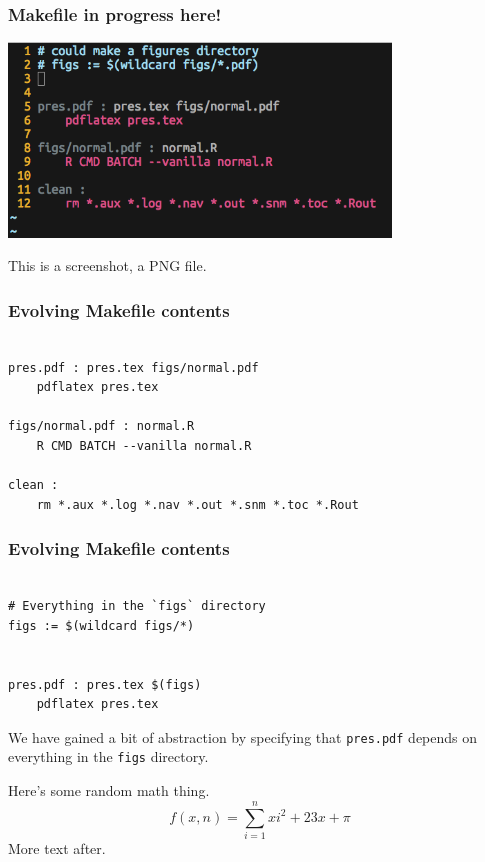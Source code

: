 \documentclass{beamer}
\begin{document}

\begin{frame}
\frametitle{Makefile in progress here!}
\includegraphics[width=4in]{figs/makefile.png}

This is a screenshot, a PNG file.
\end{frame}


\begin{frame}[fragile]
\frametitle{Evolving Makefile contents}
\begin{verbatim}

pres.pdf : pres.tex figs/normal.pdf
    pdflatex pres.tex

figs/normal.pdf : normal.R
    R CMD BATCH --vanilla normal.R 

clean :
    rm *.aux *.log *.nav *.out *.snm *.toc *.Rout

\end{verbatim}
\end{frame}


\begin{frame}[fragile]
\frametitle{Evolving Makefile contents}
\begin{verbatim}

# Everything in the `figs` directory
figs := $(wildcard figs/*)


pres.pdf : pres.tex $(figs)
    pdflatex pres.tex

\end{verbatim}

We have gained a bit of abstraction by specifying that {\tt pres.pdf} depends on everything in the {\tt figs} directory.

\end{frame}


\begin{frame}

Here's some random math thing.
\[
    f(x, n) = \sum_{i=1}^n x i^2 + 23x + \pi
\]
More text after.

\end{frame}
\end{document}
